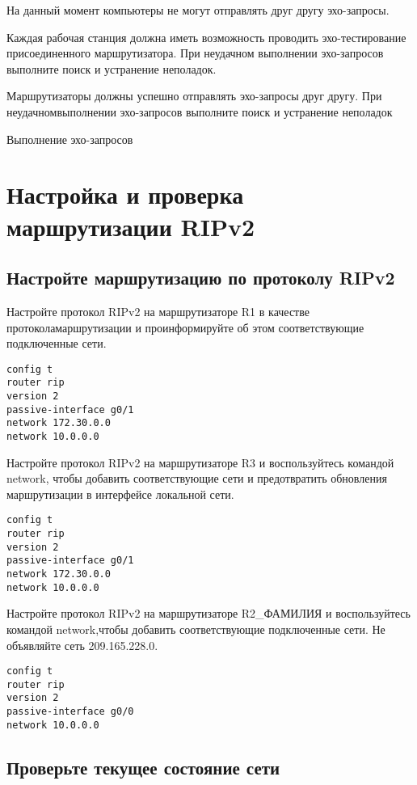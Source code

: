 На данный момент компьютеры не могут отправлять друг другу эхо-запросы.

Каждая рабочая станция должна иметь возможность проводить
эхо-тестирование присоединенного маршрутизатора.
При неудачном выполнении эхо-запросов выполните поиск и устранение неполадок.

Маршрутизаторы должны успешно отправлять эхо-запросы друг другу.
При неудачномвыполнении эхо-запросов выполните поиск и устранение неполадок

\begin{image}
    \caption{Выполнение эхо-запросов}
\end{image}

\section{Настройка и проверка маршрутизации RIPv2}

\subsection{Настройте маршрутизацию по протоколу RIPv2}
Настройте протокол RIPv2 на маршрутизаторе R1
в качестве протоколамаршрутизации и проинформируйте
об этом соответствующие подключенные сети.

\begin{verbatim}
config t
router rip
version 2
passive-interface g0/1
network 172.30.0.0
network 10.0.0.0
\end{verbatim}

Настройте протокол RIPv2 на маршрутизаторе R3 и воспользуйтесь
командой network, чтобы добавить соответствующие сети
и предотвратить обновления маршрутизации в интерфейсе локальной сети.

\begin{verbatim}
config t
router rip
version 2
passive-interface g0/1
network 172.30.0.0
network 10.0.0.0
\end{verbatim}

Настройте протокол RIPv2 на маршрутизаторе R2\_ФАМИЛИЯ и воспользуйтесь
командой network,чтобы добавить соответствующие подключенные сети.
Не объявляйте сеть 209.165.228.0.

\begin{verbatim}
config t
router rip
version 2
passive-interface g0/0
network 10.0.0.0
\end{verbatim}

\subsection{Проверьте текущее состояние сети}

